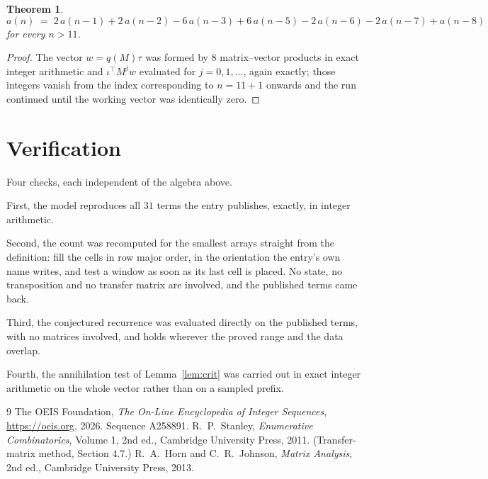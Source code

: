 \documentclass[11pt,a4paper]{article}
\theoremstyle{plain}
\newtheorem{theorem}{Theorem}
\theoremstyle{definition}
\begin{document}
\begin{theorem}
\[
a(n)\;=\;2\,a(n-1) + 2\,a(n-2) - 6\,a(n-3) + 6\,a(n-5) - 2\,a(n-6) - 2\,a(n-7) + a(n-8)
\]
for every $n>11$.
\end{theorem}

\begin{proof}
The vector $w=q(M)\tau$ was formed by $8$ matrix--vector products in exact integer
arithmetic and $\iota^{\!\top}M^{j}w$ evaluated for $j=0,1,\dots$, again exactly; those
integers vanish from the index corresponding to $n=11+1$ onwards and the run continued
until the working vector was identically zero.
\end{proof}

\section{Verification}

Four checks, each independent of the algebra above.

First, the model reproduces all $31$ terms the entry publishes, exactly, in integer
arithmetic.

Second, the count was recomputed for the smallest arrays straight from the definition: fill the
cells in row major order, in the orientation the entry's own name writes, and test a window as
soon as its last cell is placed. No state, no transposition and no transfer matrix are
involved, and the published terms came back.

Third, the conjectured recurrence was evaluated directly on the published terms, with no
matrices involved, and holds wherever the proved range and the data overlap.

Fourth, the annihilation test of Lemma~\ref{lem:crit} was carried out in exact integer
arithmetic on the whole vector rather than on a sampled prefix.

\begin{thebibliography}{9}
 The OEIS Foundation, \emph{The On-Line Encyclopedia of Integer
Sequences}, \url{https://oeis.org}, 2026. Sequence A258891.
 R.~P.~Stanley, \emph{Enumerative Combinatorics}, Volume 1, 2nd ed.,
Cambridge University Press, 2011. (Transfer-matrix method, Section 4.7.)
 R.~A.~Horn and C.~R.~Johnson, \emph{Matrix Analysis}, 2nd ed., Cambridge
University Press, 2013.
\end{thebibliography}
\end{document}
